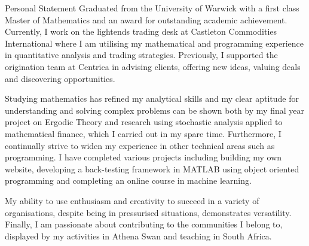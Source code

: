 \documentclass{resume} %
\begin{document}
\begin{rSection}{Personal Statement}	
Graduated from the University of Warwick with a first class Master of Mathematics and an award for outstanding academic achievement. Currently, I work on the lightends trading desk at Castleton Commodities International where I am utilising my mathematical and programming experience in quantitative analysis and trading strategies. Previously, I supported the origination team at Centrica in advising clients, offering new ideas, valuing deals and discovering opportunities.
\item Studying mathematics has refined my analytical skills and my clear aptitude for understanding and solving complex problems can be shown both by my final year project on Ergodic Theory and research using stochastic analysis applied to mathematical finance, which I carried out in my spare time. Furthermore, I continually strive to widen my experience in other technical areas such as programming. I have completed various projects including building my own website, developing a back-testing framework in MATLAB using object oriented programming and completing an online course in machine learning.
\item My ability to use enthusiasm and creativity to succeed in a variety of organisations, despite being in pressurised situations, demonstrates versatility. Finally, I am passionate about contributing to the communities I belong to, displayed by my activities in Athena Swan and teaching in South Africa.
\end{rSection}
\end{document}
